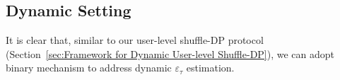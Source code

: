
















\subsection{Dynamic Setting}


It is clear that, similar to our user-level shuffle-DP protocol (Section~\ref{sec:Framework for Dynamic User-level Shuffle-DP}), we can adopt binary mechanism to address dynamic $\varepsilon_\tau$ estimation.




